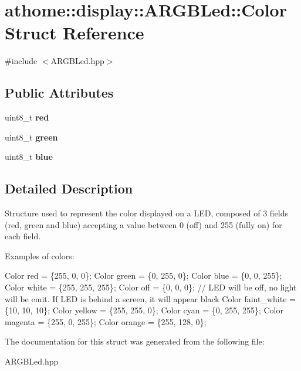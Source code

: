 \hypertarget{structathome_1_1display_1_1_a_r_g_b_led_1_1_color}{}\section{athome\+:\+:display\+:\+:A\+R\+G\+B\+Led\+:\+:Color Struct Reference}
\label{structathome_1_1display_1_1_a_r_g_b_led_1_1_color}


{\ttfamily \#include $<$A\+R\+G\+B\+Led.\+hpp$>$}

\subsection*{Public Attributes}
\begin{DoxyCompactItemize}
\item 
\mbox{\label{structathome_1_1display_1_1_a_r_g_b_led_1_1_color_a38384fe4c2a89f0879ad81ccaa377077}} 
uint8\+\_\+t {\bfseries red}
\item 
\mbox{\label{structathome_1_1display_1_1_a_r_g_b_led_1_1_color_a568646e5c308b5791def48db8f2fe5e1}} 
uint8\+\_\+t {\bfseries green}
\item 
\mbox{\label{structathome_1_1display_1_1_a_r_g_b_led_1_1_color_ae851e58f84fafd51b64c81296ae8dccf}} 
uint8\+\_\+t {\bfseries blue}
\end{DoxyCompactItemize}


\subsection{Detailed Description}
Structure used to represent the color displayed on a L\+ED, composed of 3 fields (red, green and blue) accepting a value between 0 (off) and 255 (fully on) for each field.

Examples of colors\+:


\begin{DoxyCode}
Color red = \{255, 0, 0\};
Color green = \{0, 255, 0\};
Color blue = \{0, 0, 255\};
Color white = \{255, 255, 255\};
Color off = \{0, 0, 0\}; \textcolor{comment}{// LED will be off, no light will be emit. If LED is behind a screen, it will appear
       black}
Color faint\_white = \{10, 10, 10\};
Color yellow = \{255, 255, 0\};
Color cyan = \{0, 255, 255\};
Color magenta = \{255, 0, 255\};
Color orange = \{255, 128, 0\};
\end{DoxyCode}
 

The documentation for this struct was generated from the following file\+:\begin{DoxyCompactItemize}
\item 
A\+R\+G\+B\+Led.\+hpp\end{DoxyCompactItemize}
